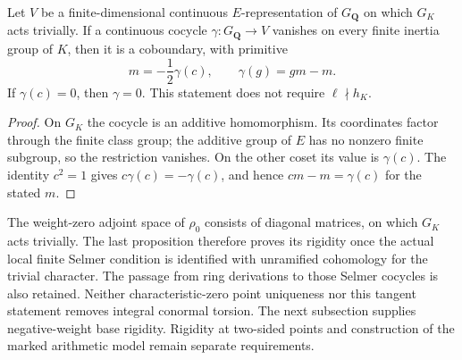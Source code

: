 \begin{proposition}
\label{prop:selmer-zero-weight-rigidity}
Let $V$ be a finite-dimensional continuous $E$-representation of
$G_{\mathbf Q}$ on which $G_K$ acts trivially.
If a continuous cocycle $\gamma:G_{\mathbf Q}\to V$ vanishes
on every finite inertia group of $K$, then it is a coboundary,
with primitive
\[
 m=-\frac12\gamma(c),\qquad \gamma(g)=gm-m.
\]
If $\gamma(c)=0$, then $\gamma=0$. This statement does not
require $\ell\nmid h_K$.
\end{proposition}

\begin{proof}
On $G_K$ the cocycle is an additive homomorphism. Its coordinates
factor through the finite class group; the additive group of $E$
has no nonzero finite subgroup, so the restriction vanishes.
On the other coset its value is $\gamma(c)$.
The identity $c^2=1$ gives $c\gamma(c)=-\gamma(c)$, and hence
$cm-m=\gamma(c)$ for the stated $m$.
\end{proof}

The weight-zero adjoint space of $\rho_0$ consists of diagonal
matrices, on which $G_K$ acts trivially. The last proposition
therefore proves its rigidity once the actual local finite Selmer
condition is identified with unramified cohomology for the trivial
character. The passage from ring derivations to those Selmer
cocycles is also retained. Neither characteristic-zero point
uniqueness nor this tangent statement removes integral conormal
torsion. The next subsection supplies negative-weight base rigidity.
Rigidity at two-sided points and construction of the marked arithmetic
model remain separate requirements.
